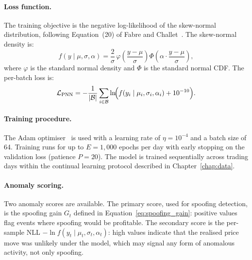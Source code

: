 \documentclass[11pt]{report}
\begin{document}
\paragraph{Loss function.}
The training objective is the negative log-likelihood of the skew-normal distribution, following Equation~(20) of Fabre and Challet~\cite{fabre_2025}. The skew-normal density is:
\begin{equation}
  \label{eq:skewnormal}
  f(y \mid \mu, \sigma, \alpha) = \frac{2}{\sigma}\, \varphi\!\left(\frac{y - \mu}{\sigma}\right) \Phi\!\left(\alpha \cdot \frac{y - \mu}{\sigma}\right),
\end{equation}
where $\varphi$ is the standard normal density and $\Phi$ is the standard normal CDF. The per-batch loss is:
\begin{equation}
  \label{eq:pnn_loss}
  \mathcal{L}_{\text{PNN}} = -\frac{1}{|\mathcal{B}|}\sum_{i \in \mathcal{B}} \ln\!\Bigl(f(y_i \mid \mu_i, \sigma_i, \alpha_i) + 10^{-10}\Bigr).
\end{equation}

\paragraph{Training procedure.}
The Adam optimiser~\cite{kingma2014adam} is used with a learning rate of $\eta = 10^{-4}$ and a batch size of 64. Training runs for up to $E = 1{,}000$ epochs per day with early stopping on the validation loss (patience $P = 20$). The model is trained sequentially across trading days within the continual learning protocol described in Chapter~\ref{chap:data}.

\paragraph{Anomaly scoring.}
Two anomaly scores are available. The primary score, used for spoofing detection, is the spoofing gain $G_t$ defined in Equation~\eqref{eq:spoofing_gain}: positive values flag events where spoofing would be profitable. The secondary score is the per-sample NLL $-\ln f(y_t \mid \mu_t, \sigma_t, \alpha_t)$: high values indicate that the realised price move was unlikely under the model, which may signal any form of anomalous activity, not only spoofing.
\end{document}
